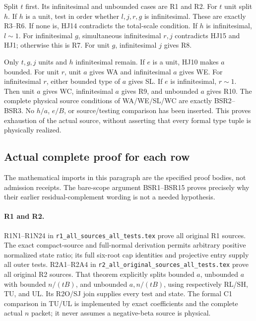 Split \(t\) first.  Its infinitesimal and unbounded
cases are R1 and R2.
For \(t\) unit split \(h\).
If \(h\) is a unit, test in order whether \(l,j,r,g\)
is infinitesimal.  These are exactly R3--R6.
If none is, HJ14 contradicts the total-scale
condition.
If \(h\) is infinitesimal, \(l\sim1\).
For infinitesimal \(g\), simultaneous infinitesimal
\(r,j\) contradicts HJ15 and HJ1; otherwise this
is R7.
For unit \(g\), infinitesimal \(j\) gives R8.

Only \(t,g,j\) units and \(h\) infinitesimal remain.
If \(e\) is a unit, HJ10 makes \(a\) bounded.
For unit \(r\), unit \(a\) gives WA and infinitesimal
\(a\) gives WE.  For infinitesimal \(r\), either
bounded type of \(a\) gives SL.
If \(e\) is infinitesimal, \(r\sim1\).
Then unit \(a\) gives WC, infinitesimal \(a\) gives
R9, and unbounded \(a\) gives R10.
The complete physical source conditions of
WA/WE/SL/WC are exactly BSR2--BSR3.
No \(h/a\), \(e/B\), or source/testing comparison
has been inserted.  This proves exhaustion of
the actual source, without asserting that every
formal type tuple is physically realized.

\subsection{Actual complete proof for each row}

The mathematical imports in this paragraph are the
specified proof bodies, not admission receipts.
The bare-scope argument BSR1--BSR15 proves precisely
why their earlier residual-complement wording is
not a needed hypothesis.

\paragraph{R1 and R2.}
R1N1--R1N24 in
\texttt{r1\_all\_sources\_all\_tests.tex}
prove all original R1 sources.
The exact compact-source and full-normal derivation
permits arbitrary positive normalized state ratio;
its full six-root cap identities and projective
entry supply all outer tests.
R2A1--R2A4 in
\texttt{r2\_all\_original\_sources\_all\_tests.tex}
prove all original R2 sources.
That theorem explicitly splits bounded \(a\),
unbounded \(a\) with bounded \(n/(tB)\), and
unbounded \(a,n/(tB)\), using respectively
RL/SH, TU, and UL.
Its R2O/SJ join supplies every test and state.
The formal C1 comparison in TU/UL is implemented
by exact coefficients and the complete actual
\(n\) packet; it never assumes a negative-beta
source is physical.

